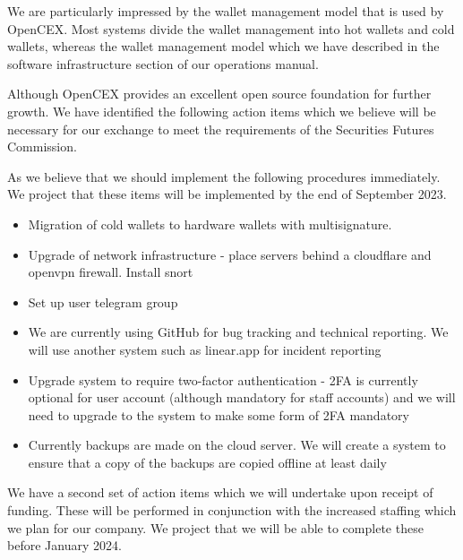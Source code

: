 \documentclass[]{report}
\begin{document}
We are particularly impressed by the wallet management model that is
used by OpenCEX.  Most systems divide the wallet management into hot
wallets and cold wallets, whereas the wallet management model which we
have described in the software infrastructure section of our
operations manual.

Although OpenCEX provides an excellent open source foundation for
further growth.  We have identified the following action items which
we believe will be necessary for our exchange to meet the requirements
of the Securities Futures Commission.

As we believe that we should implement the following procedures
immediately.  We project that these items will be implemented by the
end of September 2023.

\begin{itemize}
\item Migration of cold wallets to hardware wallets with
  multisignature.

\item Upgrade of network infrastructure - place servers behind a cloudflare and
openvpn firewall.  Install snort

\item Set up user telegram group

\item We are currently using GitHub for bug tracking and technical
  reporting.  We will use another system such as linear.app for
  incident reporting

\item Upgrade system to require two-factor authentication - 2FA is
  currently optional for user account (although mandatory for staff
  accounts) and we will need to upgrade to the system to make
  some form of 2FA mandatory

\item Currently backups are made on the cloud server.  We will create
  a system to ensure that a copy of the backups are copied offline at
  least daily
\end{itemize}

We have a second set of action items which we will undertake upon
receipt of funding.  These will be performed in conjunction with the
increased staffing which we plan for our company.  We project that we
will be able to complete these before January 2024.
\end{document}

